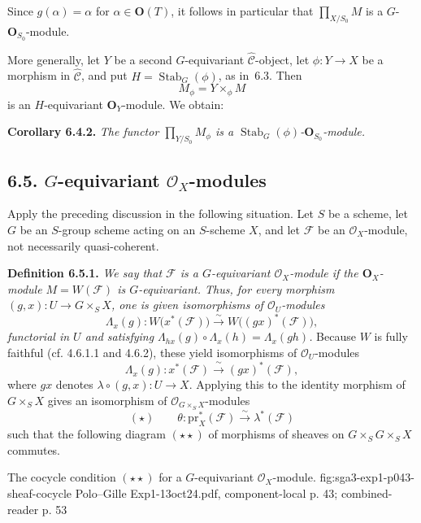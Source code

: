 Since \(g(\alpha)=\alpha\) for \(\alpha\in\mathbf O(T)\), it follows in
particular that \(\prod_{X/S_0}M\) is a
\(G\)-\(\mathbf O_{S_0}\)-module.

More generally, let \(Y\) be a second \(G\)-equivariant
\(\widehat{\mathscr C}\)-object, let \(\phi:Y\to X\) be a morphism in
\(\widehat{\mathscr C}\), and put \(H=\operatorname{Stab}_G(\phi)\), as
in~6.3. Then
\[
  M_\phi=Y\times_\phi M
\]
is an \(H\)-equivariant \(\mathbf O_Y\)-module. We obtain:

\medskip
\noindent\textbf{Corollary 6.4.2.}
\textit{The functor \(\prod_{Y/S_0}M_\phi\) is a
\(\operatorname{Stab}_G(\phi)\)-\(\mathbf O_{S_0}\)-module.}

\subsection*{6.5. \(G\)-equivariant \(\mathcal O_X\)-modules}

Apply the preceding discussion in the following situation. Let \(S\)
be a scheme, let \(G\) be an \(S\)-group scheme acting on an
\(S\)-scheme \(X\), and let \(\mathcal F\) be an
\(\mathcal O_X\)-module, not necessarily quasi-coherent.

\medskip
\noindent\textbf{Definition 6.5.1.}
\textit{We say that \(\mathcal F\) is a \(G\)-equivariant
\(\mathcal O_X\)-module if the \(\mathbf O_X\)-module
\(M=W(\mathcal F)\) is \(G\)-equivariant. Thus, for every morphism
\((g,x):U\to G\times_S X\), one is given isomorphisms of
\(\mathcal O_U\)-modules}
\[
  \Lambda_x(g):
  W\bigl(x^*(\mathcal F)\bigr)
  \xrightarrow{\ \sim\ }
  W\bigl((gx)^*(\mathcal F)\bigr),
\]
\textit{functorial in \(U\) and satisfying
\(\Lambda_{hx}(g)\circ\Lambda_x(h)=\Lambda_x(gh)\).}
Because \(W\) is fully faithful (cf. 4.6.1.1 and 4.6.2), these yield
isomorphisms of \(\mathcal O_U\)-modules
\[
  \Lambda_x(g):x^*(\mathcal F)
  \xrightarrow{\ \sim\ }(gx)^*(\mathcal F),
\]
where \(gx\) denotes \(\lambda\circ(g,x):U\to X\). Applying this to
the identity morphism of \(G\times_S X\) gives an isomorphism of
\(\mathcal O_{G\times_S X}\)-modules
\[
  (\star)\qquad
  \theta:\mathrm{pr}_X^*(\mathcal F)
  \xrightarrow{\ \sim\ }\lambda^*(\mathcal F)
\]
such that the following diagram \((\star\star)\) of morphisms of
sheaves on \(G\times_SG\times_SX\) commutes.

  {The cocycle condition \((\star\star)\) for a \(G\)-equivariant
  \(\mathcal O_X\)-module.}
  {fig:sga3-exp1-p043-sheaf-cocycle}
  {Polo--Gille Exp1-13oct24.pdf, component-local p. 43; combined-reader p. 53}

